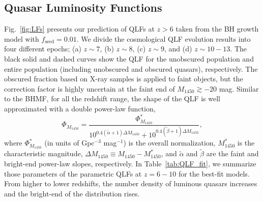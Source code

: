 \documentclass[twocolumn, twocolappendix]{aastex63}
\newcommand{\fseed}{f_\mathrm{seed}}
\newcommand{\Muv}{M_{1450}}
\begin{document}
\begin{CJK*}{UTF8}{gbsn}
\subsection{Quasar Luminosity Functions}
\label{sec:qlfglf}


Fig.~\ref{fig:LFs} presents our prediction of QLFs at $z>6$ taken from the BH growth model with $\fseed=0.01$.
We divide the cosmological QLF evolution results into four different epochs; (a) $z\sim 7$, (b) $z\sim 8$, (c) $z\sim 9$, and (d) $z\sim 10-13$.
The black solid and dashed curves show the QLF for the unobscured population 
and entire population (including unobscured and obscured quasars), respectively.
The obscured fraction based on X-ray samples \citep{2014ApJ...786..104U} is applied to faint objects, 
but the correction factor is highly uncertain at the faint end of $\Muv\gtrsim -20$ mag.
Similar to the BHMF, for all the redshift range, the shape of the QLF is well approximated with a double power-law function,
%
\begin{equation}
\Phi_{\Muv} = \frac{\Phi_{\Muv}^\ast}
{10^{0.4(\tilde \alpha+1)\Delta \Muv} + 10^{0.4(\tilde \beta+1)\Delta \Muv}},
\end{equation}
%
where $\Phi_{\Muv}^\ast$ (in units of Gpc$^{-3}$ mag$^{-1}$) is the overall normalization, $\Muv^\ast$ is the characteristic magnitude,
$\Delta \Muv \equiv \Muv - \Muv^\ast$, and $\tilde \alpha$ and $\tilde \beta$ are the faint and bright-end power-law slopes, respectively.
In Table~\ref{tab:QLF_fit}, we summarize those parameters of the parametric QLFs at $z=6-10$ for the best-fit models.
From higher to lower redshifts, the number density of luminous quasars increases and the bright-end of the distribution rises.



\end{CJK*}
\end{document}
